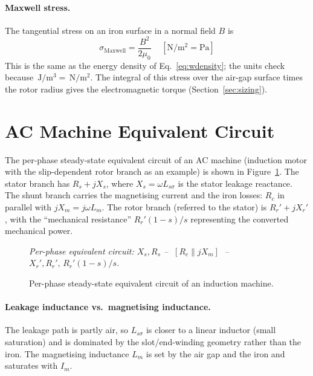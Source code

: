 \documentclass[12pt,a4paper]{article}
\newcommand{\unit}[1]{\ensuremath{\,\mathrm{#1}}}
\begin{document}
\paragraph{Maxwell stress.}
The tangential stress on an iron surface in a normal field $B$ is
\begin{equation}
  \sigma_\text{Maxwell} = \frac{B^2}{2\mu_0}
  \quad\unit{[N/m^2 = Pa]}
  \label{eq:maxwell}
\end{equation}
This is the same as the energy density of Eq.~\eqref{eq:wdensity};
the units check because $\unit{J/m^3} = \unit{N/m^2}$. The integral of
this stress over the air-gap surface times the rotor radius gives the
electromagnetic torque (Section~\ref{sec:sizing}).

\section{AC Machine Equivalent Circuit}
\label{sec:eqckt}

The per-phase steady-state equivalent circuit of an AC machine
(induction motor with the slip-dependent rotor branch as an example)
is shown in Figure~\ref{fig:eqckt}.
The stator branch has $R_s + jX_s$, where $X_s = \omega L_{s\sigma}$
is the stator leakage reactance.
The shunt branch carries the magnetising current and the iron losses:
$R_c$ in parallel with $jX_m = j\omega L_m$.
The rotor branch (referred to the stator) is $R_r' + jX_r'$, with the
``mechanical resistance'' $R_r'(1-s)/s$ representing the converted
mechanical power.

\begin{figure}[H]
  \centering
  \textit{Per-phase equivalent circuit: $X_s, R_s$ -- $\;[R_c\parallel jX_m]\;$ -- $X_r', R_r', \, R_r'(1-s)/s$.}
  \caption{Per-phase steady-state equivalent circuit of an induction
           machine.}
  \label{fig:eqckt}
\end{figure}

\paragraph{Leakage inductance vs.\ magnetising inductance.}
The leakage path is partly air, so $L_{s\sigma}$ is closer to a linear
inductor (small saturation) and is dominated by the slot/end-winding
geometry rather than the iron. The magnetising inductance $L_m$ is set
by the air gap and the iron and saturates with $I_m$.

\end{document}
